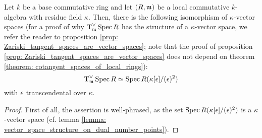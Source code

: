             \begin{theorem} \label{theorem: cotangent_spaces_of_local_rings}  
                Let $k$ be a base commutative ring and let $(R, \mathfrak{m})$ be a local commutative $k$-algebra with residue field $\kappa$. Then, there is the following isomorphism of $\kappa$-vector spaces (for a proof of why $\operatorname{T}^{\vee}_{\mathfrak{m}}\operatorname{Spec} R$ has the structure of a $\kappa$-vector space, we refer the reader to proposition \ref{prop: Zariski_tangent_spaces_are_vector_spaces}; note that the proof of proposition \ref{prop: Zariski_tangent_spaces_are_vector_spaces} does not depend on theorem \ref{theorem: cotangent_spaces_of_local_rings}):
                    $$\operatorname{T}^{\vee}_{\mathfrak{m}}\operatorname{Spec} R \simeq \operatorname{Spec} R(\kappa[\epsilon]/(\epsilon)^2)$$
                with $\epsilon$ transcendental over $\kappa$.
            \end{theorem}
                \begin{proof}
                    First of all, the assertion is well-phrased, as the set $\operatorname{Spec} R(\kappa[\epsilon]/(\epsilon)^2)$ is a $\kappa$-vector space (cf. lemma \ref{lemma: vector_space_structure_on_dual_number_points}). 
                \end{proof}

